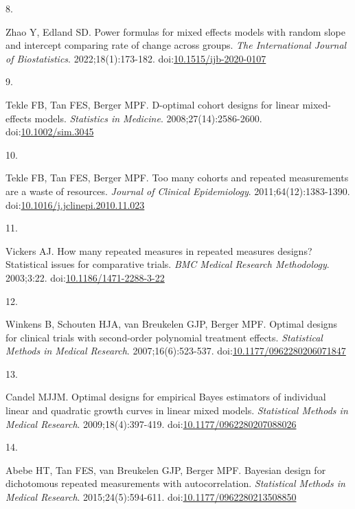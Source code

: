 \documentclass[
  11pt,
]{article}
\newlength{\cslhangindent}
\newlength{\csllabelwidth}
\newenvironment{CSLReferences}[2] %
 {\begin{list}{}{%
  \setlength{\itemindent}{0pt}
  \setlength{\leftmargin}{0pt}
  \setlength{\parsep}{0pt}
  \ifodd #1
   \setlength{\leftmargin}{\cslhangindent}
   \setlength{\itemindent}{-1\cslhangindent}
  \fi
  \setlength{\itemsep}{#2\baselineskip}}}
 {\end{list}}
\newcommand{\CSLLeftMargin}[1]{\parbox[t]{\csllabelwidth}{\strut#1\strut}}
\newcommand{\CSLRightInline}[1]{\parbox[t]{\linewidth - \csllabelwidth}{\strut#1\strut}}
\begin{document}
\begin{CSLReferences}{0}{1}
\CSLLeftMargin{8. }%
\CSLRightInline{Zhao Y, Edland SD. Power formulas for mixed effects models with random slope and intercept comparing rate of change across groups. \emph{The International Journal of Biostatistics}. 2022;18(1):173-182. doi:\href{https://doi.org/10.1515/ijb-2020-0107}{10.1515/ijb-2020-0107}}

\CSLLeftMargin{9. }%
\CSLRightInline{Tekle FB, Tan FES, Berger MPF. {D}-optimal cohort designs for linear mixed-effects models. \emph{Statistics in Medicine}. 2008;27(14):2586-2600. doi:\href{https://doi.org/10.1002/sim.3045}{10.1002/sim.3045}}

\CSLLeftMargin{10. }%
\CSLRightInline{Tekle FB, Tan FES, Berger MPF. Too many cohorts and repeated measurements are a waste of resources. \emph{Journal of Clinical Epidemiology}. 2011;64(12):1383-1390. doi:\href{https://doi.org/10.1016/j.jclinepi.2010.11.023}{10.1016/j.jclinepi.2010.11.023}}

\CSLLeftMargin{11. }%
\CSLRightInline{Vickers AJ. How many repeated measures in repeated measures designs? {Statistical} issues for comparative trials. \emph{BMC Medical Research Methodology}. 2003;3:22. doi:\href{https://doi.org/10.1186/1471-2288-3-22}{10.1186/1471-2288-3-22}}

\CSLLeftMargin{12. }%
\CSLRightInline{{Winkens B, Schouten HJA, van Breukelen GJP, Berger MPF}. Optimal designs for clinical trials with second-order polynomial treatment effects. \emph{Statistical Methods in Medical Research}. 2007;16(6):523-537. doi:\href{https://doi.org/10.1177/0962280206071847}{10.1177/0962280206071847}}

\CSLLeftMargin{13. }%
\CSLRightInline{Candel MJJM. Optimal designs for empirical {Bayes} estimators of individual linear and quadratic growth curves in linear mixed models. \emph{Statistical Methods in Medical Research}. 2009;18(4):397-419. doi:\href{https://doi.org/10.1177/0962280207088026}{10.1177/0962280207088026}}

\CSLLeftMargin{14. }%
\CSLRightInline{{Abebe HT, Tan FES, van Breukelen GJP, Berger MPF}. Bayesian design for dichotomous repeated measurements with autocorrelation. \emph{Statistical Methods in Medical Research}. 2015;24(5):594-611. doi:\href{https://doi.org/10.1177/0962280213508850}{10.1177/0962280213508850}}


\end{CSLReferences}
\end{document}
